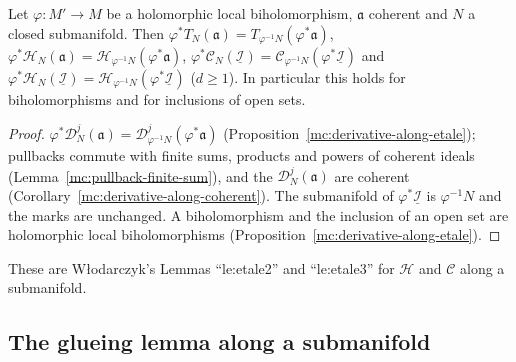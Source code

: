 \begin{lemma}
\label{mc:homogenized-along-etale}
\leanok
Let \(\varphi\colon M'\to M\) be a holomorphic local biholomorphism, \(\mathfrak a\) coherent and \(N\) a closed submanifold. Then
\(\varphi^*T_N(\mathfrak a)=T_{\varphi^{-1}N}(\varphi^*\mathfrak a)\), \(\varphi^*\mathcal H_N(\mathfrak a)=\mathcal H_{\varphi^{-1}N}(\varphi^*\mathfrak a)\),
\(\varphi^*\mathcal C_N(\underline{\mathcal I})=\mathcal C_{\varphi^{-1}N}(\varphi^*\underline{\mathcal I})\) and
\(\varphi^*\mathcal H_N(\underline{\mathcal I})=\mathcal H_{\varphi^{-1}N}(\varphi^*\underline{\mathcal I})\) (\(d\ge1\)). In particular this holds for biholomorphisms and for
inclusions of open sets.
\end{lemma}
\begin{proof}
\leanok
\(\varphi^*\mathcal D_N^j(\mathfrak a)=\mathcal D^j_{\varphi^{-1}N}(\varphi^*\mathfrak a)\) (Proposition~\ref{mc:derivative-along-etale}); pullbacks commute with finite sums, products
and powers of coherent ideals (Lemma~\ref{mc:pullback-finite-sum}), and the \(\mathcal D_N^j(\mathfrak a)\) are coherent (Corollary~\ref{mc:derivative-along-coherent}). The
submanifold of \(\varphi^*\underline{\mathcal I}\) is \(\varphi^{-1}N\) and the marks are unchanged. A biholomorphism and the inclusion of an open set are holomorphic local
biholomorphisms (Proposition~\ref{mc:derivative-along-etale}).
\end{proof}
These are Włodarczyk's Lemmas ``le:etale2'' and ``le:etale3'' for \(\mathcal H\) and \(\mathcal C\) along a submanifold.

\subsection{The glueing lemma along a submanifold}

